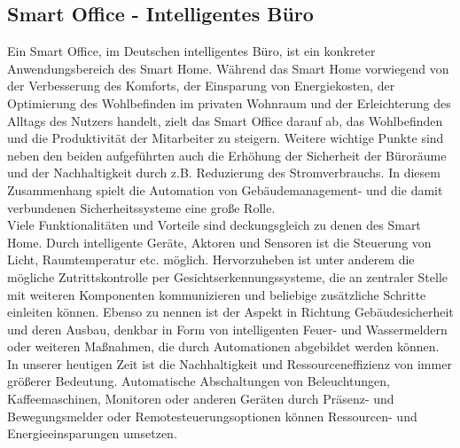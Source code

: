     \subsection{Smart Office - Intelligentes Büro}
    \label{subsec:smartoffice}
        Ein Smart Office, im Deutschen intelligentes Büro, ist ein konkreter Anwendungsbereich des Smart Home. 
        Während das Smart Home vorwiegend von der Verbesserung des Komforts, der Einsparung von Energiekosten,  
        der Optimierung des Wohlbefinden im privaten Wohnraum und der Erleichterung des Alltags des Nutzers handelt, 
        zielt das Smart Office darauf ab, das Wohlbefinden und die Produktivität der Mitarbeiter zu steigern. Weitere 
        wichtige Punkte sind neben den beiden aufgeführten auch die Erhöhung der Sicherheit der Büroräume und der 
        Nachhaltigkeit durch z.B. Reduzierung des Stromverbrauchs. In diesem Zusammenhang spielt die Automation 
        von Gebäudemanagement- und die damit verbundenen Sicherheitssysteme eine große Rolle. 
        \\
        \linebreak
        Viele Funktionalitäten und Vorteile sind deckungsgleich zu denen des Smart Home. Durch intelligente Geräte, Aktoren und 
        Sensoren ist die Steuerung von Licht, Raumtemperatur etc. möglich. Hervorzuheben ist unter anderem die mögliche Zutrittskontrolle 
        per Gesichtserkennungssysteme, die an zentraler Stelle mit weiteren Komponenten kommunizieren und beliebige zusätzliche Schritte 
        einleiten können. Ebenso zu nennen ist der Aspekt in Richtung Gebäudesicherheit und deren Ausbau, denkbar in Form von intelligenten 
        Feuer- und Wassermeldern oder weiteren Maßnahmen, die durch Automationen abgebildet werden können. 
        \\
        In unserer heutigen Zeit ist die Nachhaltigkeit und Ressourceneffizienz von immer größerer Bedeutung.
        Automatische Abschaltungen von Beleuchtungen, Kaffeemaschinen, Monitoren oder anderen Geräten durch 
        Präsenz- und Bewegungsmelder oder Remotesteuerungsoptionen können Ressourcen- und Energieeinsparungen umsetzen. 
        
